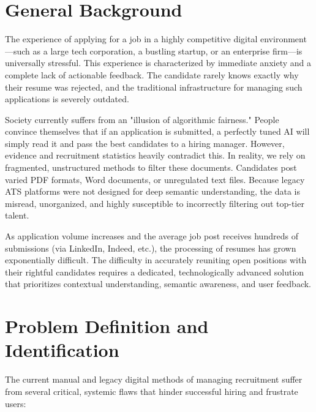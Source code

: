 \documentclass[12pt,a4paper]{report}
\begin{document}
\section{General Background}

The experience of applying for a job in a highly competitive digital environment—such as a large tech corporation, a bustling startup, or an enterprise firm—is universally stressful. This experience is characterized by immediate anxiety and a complete lack of actionable feedback. The candidate rarely knows exactly why their resume was rejected, and the traditional infrastructure for managing such applications is severely outdated. 

Society currently suffers from an "illusion of algorithmic fairness." People convince themselves that if an application is submitted, a perfectly tuned AI will simply read it and pass the best candidates to a hiring manager. However, evidence and recruitment statistics heavily contradict this. In reality, we rely on fragmented, unstructured methods to filter these documents. Candidates post varied PDF formats, Word documents, or unregulated text files. Because legacy ATS platforms were not designed for deep semantic understanding, the data is misread, unorganized, and highly susceptible to incorrectly filtering out top-tier talent.

As application volume increases and the average job post receives hundreds of submissions (via LinkedIn, Indeed, etc.), the processing of resumes has grown exponentially difficult. The difficulty in accurately reuniting open positions with their rightful candidates requires a dedicated, technologically advanced solution that prioritizes contextual understanding, semantic awareness, and user feedback.

\section{Problem Definition and Identification}

The current manual and legacy digital methods of managing recruitment suffer from several critical, systemic flaws that hinder successful hiring and frustrate users:
\end{document}
